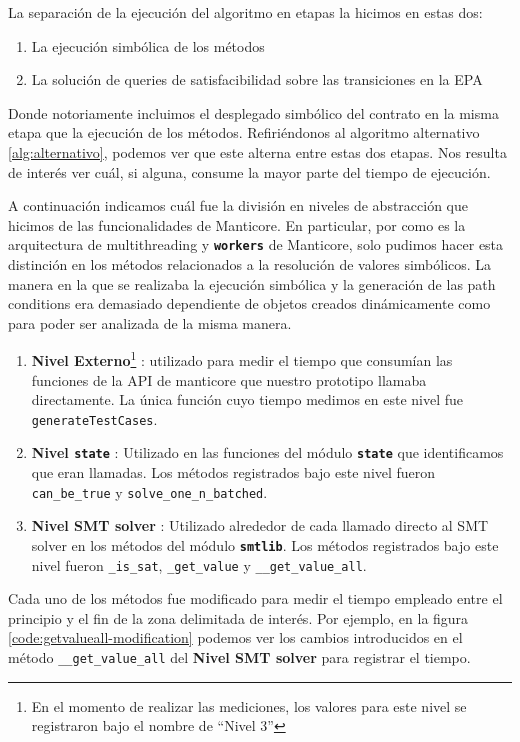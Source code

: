 La separación de la ejecución del algoritmo en etapas la hicimos en estas dos:
\begin{enumerate}
    \item La ejecución simbólica de los métodos
    \item La solución de queries de satisfacibilidad sobre las transiciones en la EPA
\end{enumerate}
Donde notoriamente incluimos el desplegado simbólico del contrato en la misma etapa que la ejecución de los métodos.
Refiriéndonos al algoritmo alternativo \ref{alg:alternativo}, podemos ver que este alterna entre estas dos etapas.
Nos resulta de interés ver cuál, si alguna, consume la mayor parte del tiempo de ejecución.

A continuación indicamos cuál fue la división en niveles de abstracción que hicimos de las funcionalidades de Manticore.
En particular, por como es la arquitectura de multithreading y \textbf{\texttt{workers}} de Manticore, solo pudimos hacer esta distinción en los métodos relacionados a la resolución de valores simbólicos.
La manera en la que se realizaba la ejecución simbólica y la generación de las path conditions era demasiado dependiente de objetos creados dinámicamente como para poder ser analizada de la misma manera.
\begin{enumerate}
    \item \textbf{Nivel Externo}\footnote{En el momento de realizar las mediciones, los valores para este nivel se registraron bajo el nombre de  ``Nivel 3''} : utilizado para medir el tiempo que consumían las funciones de la API de manticore que nuestro prototipo llamaba directamente.
          La única función cuyo tiempo medimos en este nivel fue \texttt{generateTestCases}.
    \item \textbf{Nivel \texttt{state}} : Utilizado en las funciones del módulo \textbf{\texttt{state}} que identificamos que eran llamadas.
          Los métodos registrados bajo este nivel fueron \texttt{can\_be\_true} y \texttt{solve\_\allowbreak one\_\allowbreak n\_\allowbreak batched}.
    \item \textbf{Nivel SMT solver} : Utilizado alrededor de cada llamado directo al SMT solver en los métodos del módulo \textbf{\texttt{smtlib}}.
          Los métodos registrados bajo este nivel fueron \texttt{\_is\_sat}, \texttt{\_get\_value} y \texttt{\_\_get\_value\_all}.
\end{enumerate}
Cada uno de los métodos fue modificado para medir el tiempo empleado entre el principio y el fin de la zona delimitada de interés.
Por ejemplo, en la figura \ref{code:getvalueall-modification} podemos ver los cambios introducidos en el método \texttt{\_\_get\_value\_all} del \textbf{Nivel SMT solver} para registrar el tiempo.

